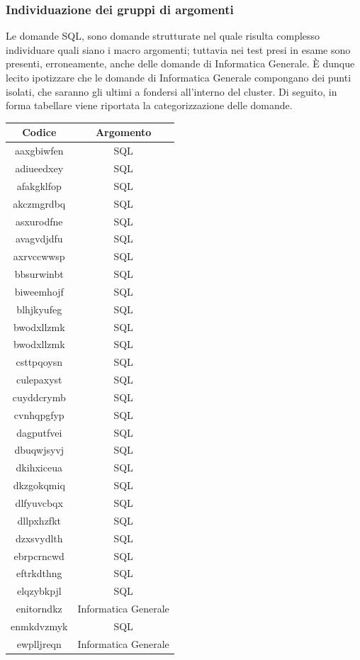\subsubsection{Individuazione dei gruppi di argomenti}
\label{Individuazione dei gruppi di argomenti 120}
Le domande SQL, sono domande strutturate nel quale risulta complesso individuare quali siano i macro argomenti; tuttavia nei test presi in esame sono presenti, erroneamente, anche delle domande di Informatica Generale.
\`E dunque lecito ipotizzare che le domande di Informatica Generale compongano dei punti isolati, che saranno gli ultimi a fondersi all'interno del cluster.
\noindent
Di seguito, in forma tabellare viene riportata la categorizzazione delle domande.
\begin{longtable}{|c|c|}
	\hline
	\textbf{Codice} & \textbf{Argomento} \\\hline\hline
aaxgbiwfen & SQL \\
adiueedxey & SQL \\
afakgklfop & SQL \\
akczmgrdbq & SQL \\
asxurodfne & SQL \\
avagvdjdfu & SQL \\
axrvccwwsp & SQL \\
bbsurwinbt & SQL \\
biweemhojf & SQL \\
blhjkyufeg & SQL \\
bwodxllzmk & SQL \\
bwodxllzmk & SQL \\
csttpqoysn & SQL \\
culepaxyst & SQL \\
cuyddcrymb & SQL \\
cvnhqpgfyp & SQL \\
dagputfvei & SQL \\
dbuqwjsyvj & SQL \\
dkihxiceua & SQL \\
dkzgokqmiq & SQL \\
dlfyuvcbqx & SQL \\
dllpxhzfkt & SQL \\
dzxsvydlth & SQL \\
ebrpcrncwd & SQL \\
eftrkdthng & SQL \\
elqzybkpjl & SQL \\
enitorndkz & Informatica Generale \\
enmkdvzmyk & SQL \\
ewplljreqn & Informatica Generale \\

\end{longtable}
